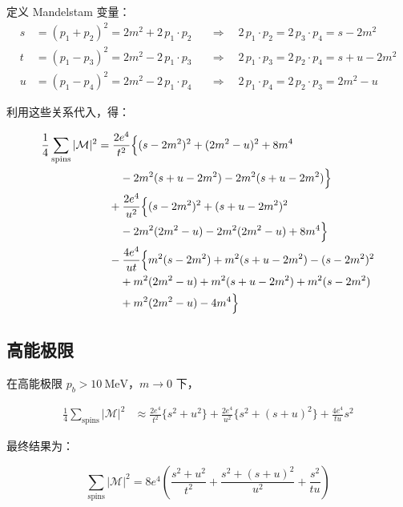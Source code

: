 定义 Mandelstam 变量：
\begin{align}
    s &= (p_1 + p_2)^2 = 2m^2 + 2\, p_1 \cdot p_2 & &\Rightarrow\quad 2\,p_1\cdot p_2 = 2\,p_3\cdot p_4 = s - 2m^2 \\
    t &= (p_1 - p_3)^2 = 2m^2 - 2\, p_1 \cdot p_3 & &\Rightarrow\quad 2\,p_1\cdot p_3 = 2\,p_2\cdot p_4 = s+u-2m^2 \\
    u &= (p_1 - p_4)^2 = 2m^2 - 2\, p_1 \cdot p_4 & &\Rightarrow\quad 2\,p_1\cdot p_4 = 2\,p_2\cdot p_3 = 2m^2 - u
\end{align}

利用这些关系代入，得：

\begin{align}
    \frac{1}{4}\sum_{\mathrm{spins}}|\mathcal{M}|^2
    &= \frac{2e^4}{t^2}
    \Bigl\{(s-2m^2)^2 + (2m^2 - u)^2 + 8m^4 \notag\\
    &\qquad - 2m^2(s+u-2m^2) - 2m^2(s+u-2m^2)\Bigr\} \notag\\
    &\quad +\frac{2e^4}{u^2}
    \Bigl\{(s-2m^2)^2 + (s+u-2m^2)^2 \notag\\
    &\qquad - 2m^2(2m^2-u) - 2m^2(2m^2-u) + 8m^4\Bigr\} \notag\\
    &\quad -\frac{4e^4}{ut}
    \Bigl\{m^2(s-2m^2) + m^2(s+u-2m^2) - (s-2m^2)^2 \notag\\
    &\qquad + m^2(2m^2-u)
    + m^2(s+u-2m^2) + m^2(s-2m^2) \notag\\
    &\qquad + m^2(2m^2-u) - 4m^4\Bigr\}
\end{align}

\subsection*{高能极限}

在高能极限 $p_b > 10\ \mathrm{MeV}$，$m \to 0$ 下，

\begin{align}
    \frac{1}{4}\sum_{\mathrm{spins}}|\mathcal{M}|^2
    &\approx
    \frac{2e^4}{t^2}\bigl\{s^2 + u^2\bigr\}
    + \frac{2e^4}{u^2}\bigl\{s^2 + (s+u)^2\bigr\}
    + \frac{4e^4}{tu} s^2
\end{align}

最终结果为：

\begin{equation}
\boxed{
    \sum_{\mathrm{spins}}|\mathcal{M}|^2
    = 8e^4 \left(
    \frac{s^2 + u^2}{t^2}
    + \frac{s^2 + (s+u)^2}{u^2}
    + \frac{s^2}{tu}
    \right)
}
\end{equation}
